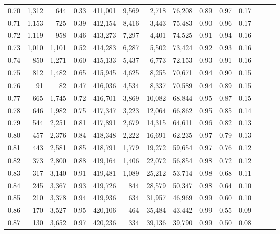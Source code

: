 \begin{tabular}{rrrrrrrrrrrrrr}
0.70 &   1,312 &    644 &  0.33 &  411,001 &    9,569 &   2,718 &  76,208 &  0.89 &  0.97 &      0.17 \\
0.71 &   1,153 &    725 &  0.39 &  412,154 &    8,416 &   3,443 &  75,483 &  0.90 &  0.96 &      0.17 \\
0.72 &   1,119 &    958 &  0.46 &  413,273 &    7,297 &   4,401 &  74,525 &  0.91 &  0.94 &      0.16 \\
0.73 &   1,010 &  1,101 &  0.52 &  414,283 &    6,287 &   5,502 &  73,424 &  0.92 &  0.93 &      0.16 \\
0.74 &     850 &  1,271 &  0.60 &  415,133 &    5,437 &   6,773 &  72,153 &  0.93 &  0.91 &      0.16 \\
0.75 &     812 &  1,482 &  0.65 &  415,945 &    4,625 &   8,255 &  70,671 &  0.94 &  0.90 &      0.15 \\
0.76 &      91 &     82 &  0.47 &  416,036 &    4,534 &   8,337 &  70,589 &  0.94 &  0.89 &      0.15 \\
0.77 &     665 &  1,745 &  0.72 &  416,701 &    3,869 &  10,082 &  68,844 &  0.95 &  0.87 &      0.15 \\
0.78 &     646 &  1,982 &  0.75 &  417,347 &    3,223 &  12,064 &  66,862 &  0.95 &  0.85 &      0.14 \\
0.79 &     544 &  2,251 &  0.81 &  417,891 &    2,679 &  14,315 &  64,611 &  0.96 &  0.82 &      0.13 \\
0.80 &     457 &  2,376 &  0.84 &  418,348 &    2,222 &  16,691 &  62,235 &  0.97 &  0.79 &      0.13 \\
0.81 &     443 &  2,581 &  0.85 &  418,791 &    1,779 &  19,272 &  59,654 &  0.97 &  0.76 &      0.12 \\
0.82 &     373 &  2,800 &  0.88 &  419,164 &    1,406 &  22,072 &  56,854 &  0.98 &  0.72 &      0.12 \\
0.83 &     317 &  3,140 &  0.91 &  419,481 &    1,089 &  25,212 &  53,714 &  0.98 &  0.68 &      0.11 \\
0.84 &     245 &  3,367 &  0.93 &  419,726 &      844 &  28,579 &  50,347 &  0.98 &  0.64 &      0.10 \\
0.85 &     210 &  3,378 &  0.94 &  419,936 &      634 &  31,957 &  46,969 &  0.99 &  0.60 &      0.10 \\
0.86 &     170 &  3,527 &  0.95 &  420,106 &      464 &  35,484 &  43,442 &  0.99 &  0.55 &      0.09 \\
0.87 &     130 &  3,652 &  0.97 &  420,236 &      334 &  39,136 &  39,790 &  0.99 &  0.50 &      0.08 \\

\end{tabular}
